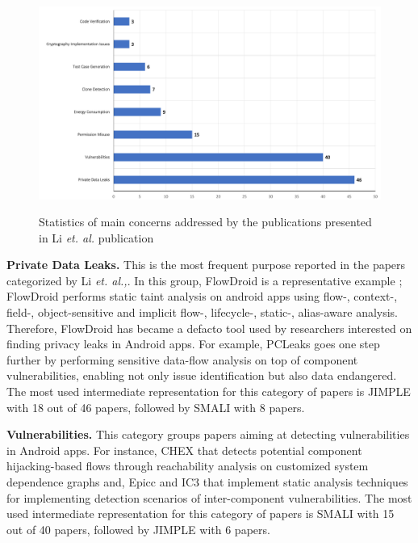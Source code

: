 \begin{figure}[t]
\caption{Statistics of main concerns addressed by the publications presented in Li \textit{et. al.} publication}
\centering
\includegraphics[width=\textwidth]{../Figures/publicationDistribution}
\label{fig:sAPD}
\end{figure}



\textbf{Private Data Leaks.} This is the most frequent purpose reported in the papers categorized by Li \textit{et. al.,}. In this group, FlowDroid is a representative example \cite{Arzt:2014}; FlowDroid  performs static taint analysis on android apps using flow-, context-, field-, object-sensitive and implicit flow-, lifecycle-, static-, alias-aware analysis. Therefore, FlowDroid has became a defacto tool used by researchers interested on finding privacy leaks in Android apps. For example, PCLeaks \cite{li:TrustCom2014} goes one step further by performing sensitive data-flow analysis on top of component vulnerabilities, enabling not only issue identification but also data endangered. The most used intermediate representation for this category of papers is JIMPLE with 18 out of 46 papers, followed by SMALI with 8 papers.

\textbf{Vulnerabilities.} This category groups papers aiming at detecting vulnerabilities in Android apps. For instance,  CHEX\cite{lu:CCS2012} that detects potential component hijacking-based flows through reachability analysis on customized system dependence graphs and, Epicc \cite{octeau:Security2013} and IC3 \cite{octeau:ICSE2015} that implement static analysis techniques for implementing detection scenarios of inter-component vulnerabilities. The most used intermediate representation for this category of papers is SMALI with 15 out of 40 papers, followed by JIMPLE with 6 papers.

